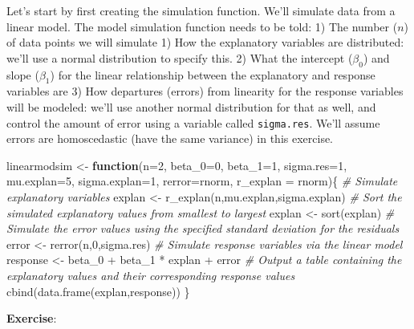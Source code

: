 \documentclass[
]{book}
\newenvironment{Shaded}{\begin{snugshade}}{\end{snugshade}}
\newcommand{\AttributeTok}[1]{\textcolor[rgb]{0.77,0.63,0.00}{#1}}
\newcommand{\CommentTok}[1]{\textcolor[rgb]{0.56,0.35,0.01}{\textit{#1}}}
\newcommand{\ControlFlowTok}[1]{\textcolor[rgb]{0.13,0.29,0.53}{\textbf{#1}}}
\newcommand{\DecValTok}[1]{\textcolor[rgb]{0.00,0.00,0.81}{#1}}
\newcommand{\FunctionTok}[1]{\textcolor[rgb]{0.00,0.00,0.00}{#1}}
\newcommand{\NormalTok}[1]{#1}
\newcommand{\OtherTok}[1]{\textcolor[rgb]{0.56,0.35,0.01}{#1}}
\newcommand{\SpecialCharTok}[1]{\textcolor[rgb]{0.00,0.00,0.00}{#1}}
\begin{document}
Let's start by first creating the simulation function. We'll simulate data from a linear model. The model simulation function needs to be told:
1) The number (\(n\)) of data points we will simulate
1) How the explanatory variables are distributed: we'll use a normal distribution to specify this.
2) What the intercept (\(\beta_0\)) and slope (\(\beta_1\)) for the linear relationship between the explanatory and response variables are
3) How departures (errors) from linearity for the response variables will be modeled: we'll use another normal distribution for that as well, and control the amount of error using a variable called \texttt{sigma.res}. We'll assume errors are homoscedastic (have the same variance) in this exercise.

\begin{Shaded}
\begin{Highlighting}[]
\NormalTok{linearmodsim }\OtherTok{\textless{}{-}} \ControlFlowTok{function}\NormalTok{(}\AttributeTok{n=}\DecValTok{2}\NormalTok{, }\AttributeTok{beta\_0=}\DecValTok{0}\NormalTok{, }\AttributeTok{beta\_1=}\DecValTok{1}\NormalTok{, }\AttributeTok{sigma.res=}\DecValTok{1}\NormalTok{, }\AttributeTok{mu.explan=}\DecValTok{5}\NormalTok{, }\AttributeTok{sigma.explan=}\DecValTok{1}\NormalTok{, }\AttributeTok{rerror=}\NormalTok{rnorm, }\AttributeTok{r\_explan =}\NormalTok{ rnorm)\{}
  \CommentTok{\# Simulate explanatory variables}
\NormalTok{  explan }\OtherTok{\textless{}{-}} \FunctionTok{r\_explan}\NormalTok{(n,mu.explan,sigma.explan)}
  \CommentTok{\# Sort the simulated explanatory values from smallest to largest}
\NormalTok{  explan }\OtherTok{\textless{}{-}} \FunctionTok{sort}\NormalTok{(explan)}
  \CommentTok{\# Simulate the error values using the specified standard deviation for the residuals}
\NormalTok{  error }\OtherTok{\textless{}{-}} \FunctionTok{rerror}\NormalTok{(n,}\DecValTok{0}\NormalTok{,sigma.res)}
  \CommentTok{\# Simulate response variables via the linear model}
\NormalTok{  response }\OtherTok{\textless{}{-}}\NormalTok{ beta\_0 }\SpecialCharTok{+}\NormalTok{ beta\_1 }\SpecialCharTok{*}\NormalTok{ explan }\SpecialCharTok{+}\NormalTok{ error}
  \CommentTok{\# Output a table containing the explanatory values and their corresponding response values}
  \FunctionTok{cbind}\NormalTok{(}\FunctionTok{data.frame}\NormalTok{(explan,response))}
\NormalTok{\}}
\end{Highlighting}
\end{Shaded}

\textbf{Exercise}:
\end{document}
